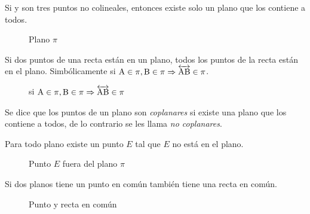 \begin{postulate}
    Si  y  son tres puntos no colineales, entonces existe solo un plano que los contiene a todos.
    
    \begin{figure}[!h]
        \centering
        
        \caption{Plano $\pi$}
        \label{fig:plot5}
    \end{figure}
\end{postulate}

\clearpage

\begin{postulate}
    Si dos puntos de una recta están en un plano, todos los puntos de la recta están en el plano. Simbólicamente si $\rm A \in \pi, \rm B \in \pi \Rightarrow \overleftrightarrow{\rm AB} \in \pi$.
    
    \begin{figure}[!h]
        \centering
        
        \caption{si $\rm A \in \pi, \rm B \in \pi \Rightarrow \overleftrightarrow{\rm AB} \in \pi$}
        \label{fig:plot8}
    \end{figure}
    
\end{postulate}

\begin{definition}
    Se dice que los puntos de un plano son \textit{coplanares} si existe una plano que los contiene a todos, de lo contrario se les llama \textit{no coplanares}.
\end{definition}

\begin{postulate}
    Para todo plano existe un punto $E$ tal que $E$ no está en el plano.
    
    \begin{figure}[!h]
        \centering
        
        \caption{Punto $E$ fuera del plano $\pi$}
        \label{fig:plot7}
    \end{figure}
\end{postulate}

\begin{postulate}
    Si dos planos tiene un punto en común también tiene una recta en común.
    
    \begin{figure}[!h]
        \centering
        
        \caption{Punto y recta en común}
        \label{fig:plot9}
    \end{figure}
    
\end{postulate}

